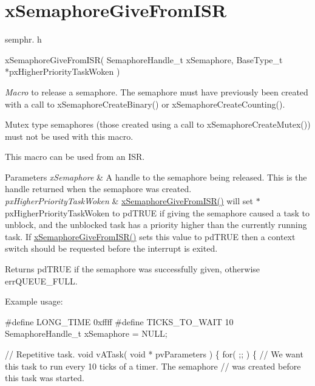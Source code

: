 \hypertarget{group__xSemaphoreGiveFromISR}{}\section{x\+Semaphore\+Give\+From\+I\+SR}
\label{group__xSemaphoreGiveFromISR}
semphr. h 
\begin{DoxyPre}
xSemaphoreGiveFromISR(
                         SemaphoreHandle\_t xSemaphore,
                         BaseType\_t *pxHigherPriorityTaskWoken
                     )\end{DoxyPre}


{\itshape Macro} to release a semaphore. The semaphore must have previously been created with a call to x\+Semaphore\+Create\+Binary() or x\+Semaphore\+Create\+Counting().

Mutex type semaphores (those created using a call to x\+Semaphore\+Create\+Mutex()) must not be used with this macro.

This macro can be used from an I\+SR.


\begin{DoxyParams}{Parameters}
{\em x\+Semaphore} & A handle to the semaphore being released. This is the handle returned when the semaphore was created.\\
\hline
{\em px\+Higher\+Priority\+Task\+Woken} & \hyperlink{semphr_8h_a68aa43df8b2a0dbe17d05fad74670ef0}{x\+Semaphore\+Give\+From\+I\+S\+R()} will set $\ast$px\+Higher\+Priority\+Task\+Woken to pd\+T\+R\+UE if giving the semaphore caused a task to unblock, and the unblocked task has a priority higher than the currently running task. If \hyperlink{semphr_8h_a68aa43df8b2a0dbe17d05fad74670ef0}{x\+Semaphore\+Give\+From\+I\+S\+R()} sets this value to pd\+T\+R\+UE then a context switch should be requested before the interrupt is exited.\\
\hline
\end{DoxyParams}
\begin{DoxyReturn}{Returns}
pd\+T\+R\+UE if the semaphore was successfully given, otherwise err\+Q\+U\+E\+U\+E\+\_\+\+F\+U\+LL.
\end{DoxyReturn}
Example usage\+: 
\begin{DoxyPre}
\#define LONG\_TIME 0xffff
\#define TICKS\_TO\_WAIT  10
SemaphoreHandle\_t xSemaphore = NULL;\end{DoxyPre}



\begin{DoxyPre}// Repetitive task.
void vATask( void * pvParameters )
\{
   for( ;; )
   \{
       // We want this task to run every 10 ticks of a timer.  The semaphore
       // was created before this task was started.\end{DoxyPre}



